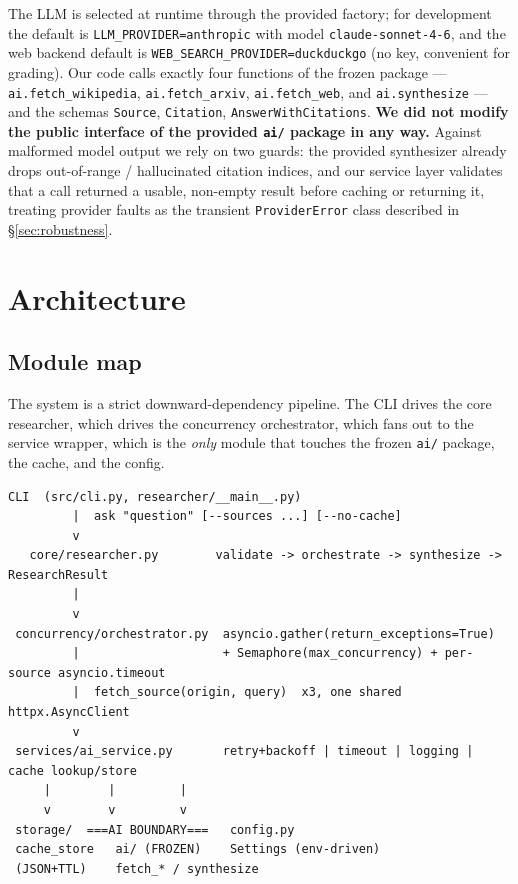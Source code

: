 \documentclass[11pt,a4paper]{article}
\begin{document}
The LLM is selected at runtime through the provided factory; for development the default is
\texttt{LLM\_PROVIDER=anthropic} with model \texttt{claude-sonnet-4-6}, and the web backend
default is \texttt{WEB\_SEARCH\_PROVIDER=duckduckgo} (no key, convenient for grading). Our
code calls exactly four functions of the frozen package --- \texttt{ai.fetch\_wikipedia},
\texttt{ai.fetch\_arxiv}, \texttt{ai.fetch\_web}, and \texttt{ai.synthesize} --- and the
schemas \texttt{Source}, \texttt{Citation}, \texttt{AnswerWithCitations}.
\textbf{We did not modify the public interface of the provided \texttt{ai/} package in any
way.} Against malformed model output we rely on two guards: the provided synthesizer already
drops out-of-range / hallucinated citation indices, and our service layer validates that a
call returned a usable, non-empty result before caching or returning it, treating provider
faults as the transient \texttt{ProviderError} class described in \S\ref{sec:robustness}.

\section{Architecture}\label{sec:arch}

\subsection{Module map}

The system is a strict downward-dependency pipeline. The CLI drives the core researcher, which
drives the concurrency orchestrator, which fans out to the service wrapper, which is the
\emph{only} module that touches the frozen \texttt{ai/} package, the cache, and the config.

\begin{lstlisting}[style=plain]
        CLI  (src/cli.py, researcher/__main__.py)
         |  ask "question" [--sources ...] [--no-cache]
         v
   core/researcher.py        validate -> orchestrate -> synthesize -> ResearchResult
         |
         v
 concurrency/orchestrator.py  asyncio.gather(return_exceptions=True)
         |                    + Semaphore(max_concurrency) + per-source asyncio.timeout
         |  fetch_source(origin, query)  x3, one shared httpx.AsyncClient
         v
 services/ai_service.py       retry+backoff | timeout | logging | cache lookup/store
     |        |         |
     v        v         v
 storage/  ===AI BOUNDARY===   config.py
 cache_store   ai/ (FROZEN)    Settings (env-driven)
 (JSON+TTL)    fetch_* / synthesize
\end{lstlisting}
\end{document}
